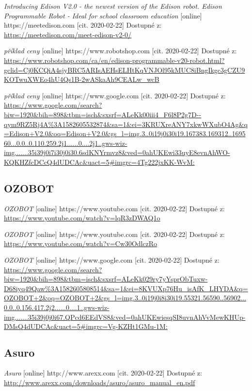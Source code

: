 \documentclass{template/socthesis}
\begin{document}
\begin{thebibliography}{12}
	\textit{Introducing Edison V2.0 - the newest version of the Edison robot. Edison Programmable Robot - Ideal for school classroom education} [online] https://meetedison.com [cit. 2020-02-22] Dostupné z:
	\url{https://meetedison.com/meet-edison-v2-0/}
	
	\textit{příklad ceny} [online] https://www.robotshop.com [cit. 2020-02-22] Dostupné z: \\ 
	\url{https://www.robotshop.com/ca/en/edison-programmable-v20-robot.html?gclid=Cj0KCQiA4sjyBRC5ARIsAEHsELHtKqVNJOl95kMUC8iBngIkgc3gCZU9KOTwuXWEo4hU4Qs1B-2wASkaAh9CEALw_wcB}
	
	\textit{příklad ceny} [online] https://www.google.com [cit. 2020-02-22] Dostupné z: \\ 
	\url{https://www.google.com/search?biw=1920&bih=898&tbm=isch&sxsrf=ALeKk00iii4_F6l8P2g7D--qym9RZ5Rj4A%3A1582605532874&sa=1&ei=3KRUXreANY7xkwWXubO4Ag&q=Edison+V2.0&oq=Edison+V2.0&gs_l=img.3..0i19j0i30i19.167383.169312..169560...0.0..0.110.259.2j1......0....2j1..gws-wiz-img.......35i39j0i7i30j0i30.6sdKNYrmvz8&ved=0ahUKEwi33uyE8evnAhWO-KQKHZfcDCcQ4dUDCAc&uact=5#imgrc=4Tg222jxKK-WvM:}
	
	\subsection*{OZOBOT}
	\textit{OZOBOT} [online] https://www.youtube.com [cit. 2020-02-22] Dostupné z:
	\url{https://www.youtube.com/watch?v=lqR3zDWAQ1o}
	
	\textit{OZOBOT} [online] https://www.youtube.com [cit. 2020-02-22] Dostupné z:
	\url{https://www.youtube.com/watch?v=Cw30OdlczRo}
	
	\textit{OZOBOT} [online] https://www.google.com [cit. 2020-02-22] Dostupné z:
	\url{https://www.google.com/search?biw=1920&bih=898&tbm=isch&sxsrf=ALeKk029ry7yYsprObTuxw-D68iyq49Qaw%3A1582605808514&sa=1&ei=8KVUXp76Hu_isAfK_LHYDA&q=OZOBOT+2&oq=OZOBOT+2&gs_l=img.3..0i19j0i8i30i19.55321.56590..56902...0.0..0.156.417.2j2......0....1..gws-wiz-img.......35i39j0j0i67.QPcd6EEdVS8&ved=0ahUKEwiesqSI8uvnAhVvMewKHUp-DMsQ4dUDCAc&uact=5#imgrc=Vg-KZHt1GMu-1M:}
	
	\subsection*{Asuro}
	\textit{Asuro} [online] http://www.arexx.com [cit. 2020-02-22] Dostupné z:
	\url{ http://www.arexx.com/downloads/asuro/asuro_manual_en.pdf}
	

\end{thebibliography}
\end{document}
